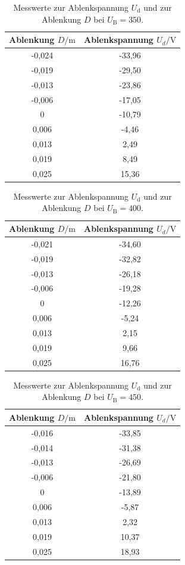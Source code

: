 \begin{table}
  \caption{Messwerte zur Ablenkspannung $U_\mathrm{d}$ und zur Ablenkung $D$ bei $U_\mathrm{B}=350$.}
  \centering
  \label{tab:messwerte2}
  \begin{tabular}{c c}
    \toprule
   Ablenkung $D/\si{\meter}$ &  Ablenkspannung $U_d/\si{\volt}$\\
    \midrule
-0,024 &-33,96 \\
-0,019 & -29,50 \\
-0,013 & -23,86 \\
-0,006 & -17,05 \\
0 & -10,79 \\
0,006 & -4,46 \\
0,013 & 2,49 \\
0,019 & 8,49 \\
0,025 & 15,36 \\
    \bottomrule
    \end{tabular}
\end{table}

\begin{table}
  \caption{Messwerte zur Ablenkspannung $U_\mathrm{d}$ und zur Ablenkung $D$ bei $U_\mathrm{B}=400$.}
  \centering
  \label{tab:messwerte3}
  \begin{tabular}{c c }
    \toprule
   Ablenkung $D/\si{\meter}$ & Ablenkspannung $U_d/\si{\volt}$\\
    \midrule
-0,021 &-34,60 \\
-0,019 & -32,82 \\
-0,013 & -26,18 \\
-0,006 & -19,28 \\
0 & -12,26 \\
0,006 & -5,24 \\
0,013 & 2,15 \\
0,019 & 9,66 \\
0,025 & 16,76 \\
    \bottomrule
    \end{tabular}
\end{table}

\begin{table}
  \caption{Messwerte zur Ablenkspannung $U_\mathrm{d}$ und zur Ablenkung $D$ bei $U_\mathrm{B}=450$.}
  \centering
  \label{tab:messwerte4}
  \begin{tabular}{c c }
    \toprule
    Ablenkung $D/\si{\meter}$ &  Ablenkspannung $U_d/\si{\volt}$\\
    \midrule
-0,016 &-33,85 \\
-0,014 & -31,38 \\
-0,013 & -26,69 \\
-0,006 & -21,80 \\
0 & -13,89 \\
0,006 & -5,87 \\
0,013 & 2,32 \\
0,019 & 10,37 \\
0,025 & 18,93 \\
    \bottomrule
    \end{tabular}
\end{table}


